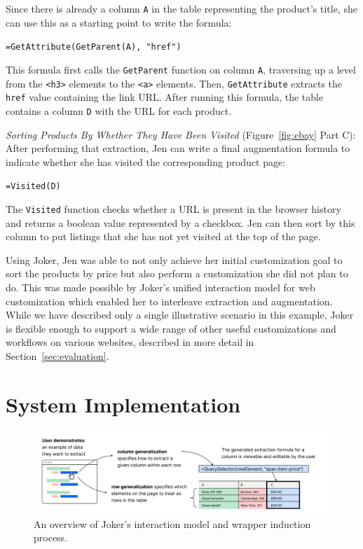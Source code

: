 \documentclass[sigconf,10pt]{acmart}
\begin{document}
Since there is already a column \texttt{A} in the table representing the
product's title, she can use this as a starting point to write the
formula:

\texttt{=GetAttribute(GetParent(A),\ "href")}

This formula first calls the \texttt{GetParent} function on column
\texttt{A}, traversing up a level from the
\texttt{\textless{}h3\textgreater{}} elements to the
\texttt{\textless{}a\textgreater{}} elements. Then,
\texttt{GetAttribute} extracts the \texttt{href} value containing the
link URL. After running this formula, the table contains a column
\texttt{D} with the URL for each product.

\emph{Sorting Products By Whether They Have Been Visited}
(Figure~\ref{fig:ebay} Part C): After performing that extraction, Jen
can write a final augmentation formula to indicate whether she has
visited the corresponding product page:

\texttt{=Visited(D)}

The \texttt{Visited} function checks whether a URL is present in the
browser history and returns a boolean value represented by a checkbox.
Jen can then sort by this column to put listings that she has not yet
visited at the top of the page.

Using Joker, Jen was able to not only achieve her initial customization
goal to sort the products by price but also perform a customization she
did not plan to do. This was made possible by Joker's unified
interaction model for web customization which enabled her to interleave
extraction and augmentation. While we have described only a single
illustrative scenario in this example, Joker is flexible enough to
support a wide range of other useful customizations and workflows on
various websites, described in more detail in
Section~\ref{sec:evaluation}.

\hypertarget{sec:implementation}{%
\section{System Implementation}\label{sec:implementation}}

\begin{figure}
  \includegraphics[width=\textwidth]{media/overview.png}
  \caption{\label{fig:overview}An overview of Joker's interaction model and wrapper induction process.}
\end{figure}
\end{document}
